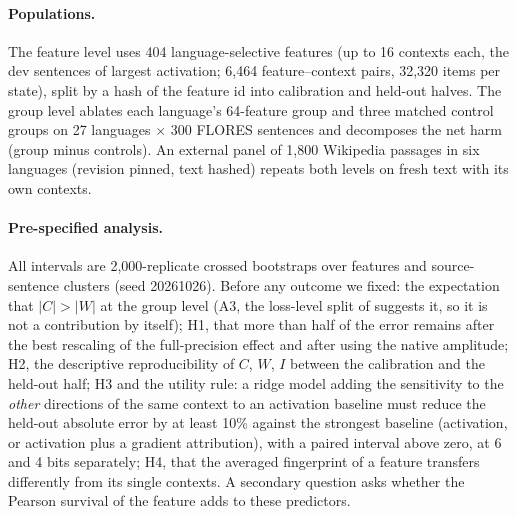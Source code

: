 \paragraph{Populations.}
The feature level uses 404 language-selective features (up to 16 contexts each, the dev sentences of largest activation; 6,464 feature--context pairs, 32,320 items per state), split by a hash of the feature id into calibration and held-out halves. The group level ablates each language's 64-feature group and three matched control groups on 27 languages $\times$ 300 FLORES sentences and decomposes the net harm (group minus controls). An external panel of 1,800 Wikipedia passages in six languages (revision pinned, text hashed) repeats both levels on fresh text with its own contexts.

\paragraph{Pre-specified analysis.}
All intervals are 2,000-replicate crossed bootstraps over features and source-sentence clusters (seed 20261026). Before any outcome we fixed: the expectation that $|C|>|W|$ at the group level (A3, the loss-level split of \citet{chang-etal-2025-inputs} suggests it, so it is not a contribution by itself); H1, that more than half of the error remains after the best rescaling of the full-precision effect and after using the native amplitude; H2, the descriptive reproducibility of $C$, $W$, $I$ between the calibration and the held-out half; H3 and the utility rule: a ridge model adding the sensitivity to the \emph{other} directions of the same context to an activation baseline must reduce the held-out absolute error by at least 10\% against the strongest baseline (activation, or activation plus a gradient attribution), with a paired interval above zero, at 6 and 4 bits separately; H4, that the averaged fingerprint of a feature transfers differently from its single contexts. A secondary question asks whether the Pearson survival of the feature adds to these predictors.
